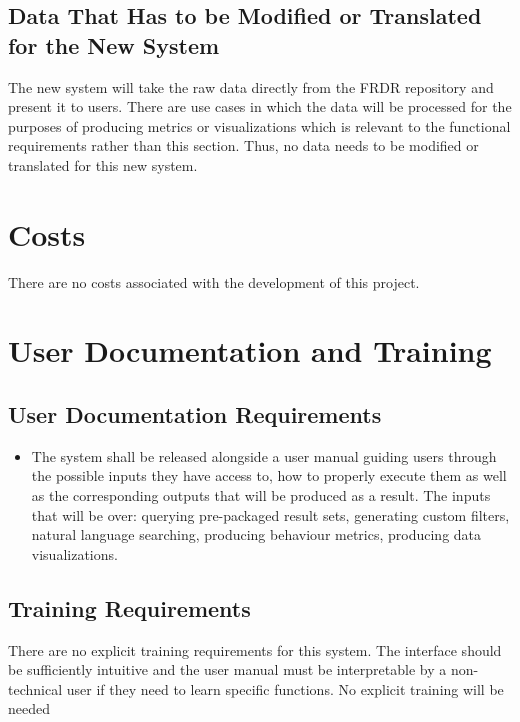 \documentclass[12pt]{article}
\begin{document}
\subsection{Data That Has to be Modified or Translated for the New System}

\par{The new system will take the raw data directly from the FRDR repository and present it to users. There are use cases in which the data will be processed for the purposes 
     of producing metrics or visualizations which is relevant to the functional requirements rather than this section. Thus, no data needs to be modified or translated for this new system.}

\section{Costs}

\par{There are no costs associated with the development of this project.}

\section{User Documentation and Training}
\subsection{User Documentation Requirements}

\begin{itemize}
    \item The system shall be released alongside a user manual guiding users through the possible inputs they have access to, how to properly execute them as well as the corresponding outputs that will be produced as a result. The inputs that 
    will be over: querying pre-packaged result sets, generating custom filters, natural language searching, producing behaviour metrics, producing data visualizations.
\end{itemize}

\subsection{Training Requirements}

\par{ There are no explicit training requirements for this system. The interface should be sufficiently intuitive and the user manual must be interpretable by a non-technical user if they need to learn specific functions.
No explicit training will be needed }
\end{document}
